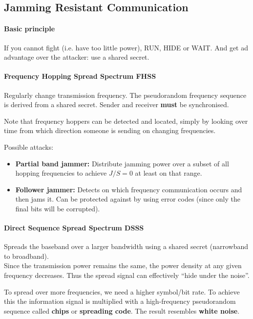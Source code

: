 \subsection{Jamming Resistant Communication}

\paragraph{Basic principle}
If you cannot fight (i.e. have too little power), RUN, HIDE or WAIT.
And get ad advantage over the attacker: use a shared secret.

\paragraph{Frequency Hopping Spread Spectrum FHSS}
Regularly change transmission frequency.
The pseudorandom frequency sequence is derived from a shared secret.
Sender and receiver \textbf{must} be synchronised.

Note that frequency hoppers can be detected and located, simply by looking over time from which direction someone is sending on changing frequencies.

Possible attacks:
\begin{itemize}
	\item \textbf{Partial band jammer:}
	Distribute jamming power over a subset of all hopping frequencies to achieve $J/S=0$ at least on that range.
	\item \textbf{Follower jammer:}
	Detects on which frequency communication occurs and then jams it.
	Can be protected against by using error codes (since only the final bits will be corrupted).
\end{itemize}

\paragraph{Direct Sequence Spread Spectrum DSSS}
Spreads the baseband over a larger bandwidth using a shared secret (narrowband to broadband). \\
Since the transmission power remains the same, the power density at any given frequency decreases.
Thus the spread signal can effectively ``hide under the noise''.

To spread over more frequencies, we need a higher symbol/bit rate.
To achieve this the information signal is multiplied with a high-frequency pseudorandom sequence called \textbf{chips} or \textbf{spreading code}.
The result resembles \textbf{white noise}.

